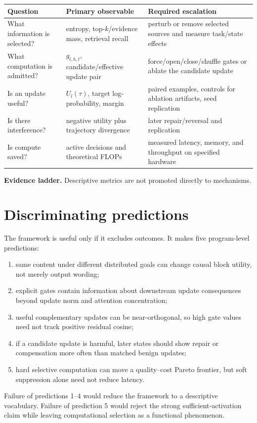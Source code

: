 \documentclass[10pt]{article}
\begin{document}
\begin{center}
\centering
\small
\begin{tabular}{p{.19\linewidth}p{.27\linewidth}p{.43\linewidth}}
\toprule
Question & Primary observable & Required escalation \\
\midrule
What information is selected? & entropy, top-$k$/evidence mass, retrieval recall & perturb or remove selected sources and measure task/state effects \\
What computation is admitted? & $g_{l,h,t}$, candidate/effective update pair & force/open/close/shuffle gates or ablate the candidate update \\
Is an update useful? & $U_l(\tau)$, target log-probability, margin & paired examples, controls for ablation artifacts, seed replication \\
Is there interference? & negative utility plus trajectory divergence & later repair/reversal and replication \\
Is compute saved? & active decisions and theoretical FLOPs & measured latency, memory, and throughput on specified hardware \\
\bottomrule
\end{tabular}

\medskip
\textbf{Evidence ladder.} Descriptive metrics are not promoted directly to mechanisms.
\end{center}

\section{Discriminating predictions}
The framework is useful only if it excludes outcomes. It makes five program-level predictions:
\begin{enumerate}[leftmargin=*]
\item same content under different distributed goals can change causal block utility, not merely output wording;
\item explicit gates contain information about downstream update consequences beyond update norm and attention concentration;
\item useful complementary updates can be near-orthogonal, so high gate values need not track positive residual cosine;
\item if a candidate update is harmful, later states should show repair or compensation more often than matched benign updates;
\item hard selective computation can move a quality--cost Pareto frontier, but soft suppression alone need not reduce latency.
\end{enumerate}
Failure of predictions 1--4 would reduce the framework to a descriptive vocabulary. Failure of prediction 5 would reject the strong sufficient-activation claim while leaving computational selection as a functional phenomenon.
\end{document}
